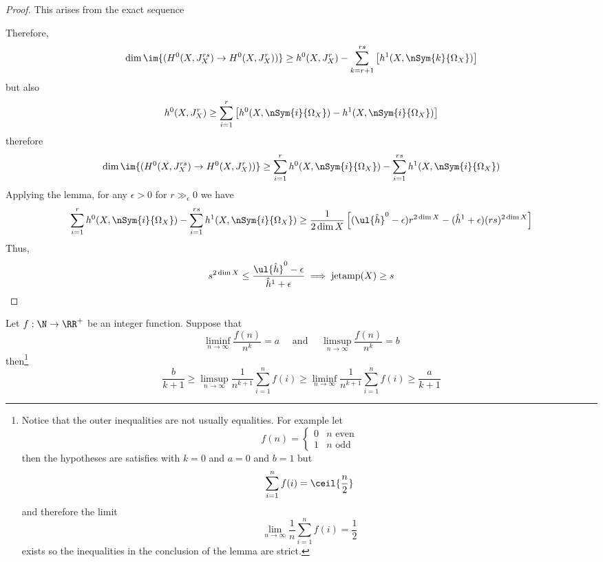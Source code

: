 \documentclass[12pt]{article}
\begin{document}
\begin{proof}
This arises from the exact sequence
\begin{center}
\end{center}
Therefore, 
\[ \dim \im{(H^0(X, J^{rs}_X) \to H^0(X, J^r_X))} \ge h^0(X, J^r_X) - \sum_{k = r+1}^{rs} \left[h^1(X, \nSym{k}{\Omega_X}) \right] \]
but also
\[ h^0(X, J^r_X) \ge \sum_{i = 1}^r \left[ h^0(X, \nSym{i}{\Omega_X}) - h^1(X, \nSym{i}{\Omega_X}) \right] \] 
therefore
\[ \dim \im{(H^0(X, J^{rs}_X) \to H^0(X, J^r_X))} \ge \sum_{i = 1}^r h^0(X, \nSym{i}{\Omega_X}) - \sum_{i = 1}^{rs} h^1(X, \nSym{i}{\Omega_X}) \]
Applying the lemma, for any $\epsilon > 0$ for $r \gg_{\epsilon} 0$ we have
\[ \sum_{i = 1}^r h^0(X, \nSym{i}{\Omega_X}) - \sum_{i = 1}^{rs} h^1(X, \nSym{i}{\Omega_X}) \ge \frac{1}{2 \dim{X}} \left[ (\ul{\hat{h}}^0 - \epsilon) r^{2 \dim{X}} - (\hat{h}^1 + \epsilon) (rs)^{2 \dim{X}} \right] \]
Thus,
\[ s^{2 \dim{X}} \le \frac{\ul{\hat{h}}^0 - \epsilon}{\hat{h}^1 + \epsilon} \implies \jetamp(X) \ge s  \]
\end{proof}

\begin{lemma}
Let $f : \N \to \RR^+$ be an integer function. Suppose that
\[ \liminf_{n \to \infty} \frac{f(n)}{n^k} = a \quad \text{ and } \quad \limsup_{n \to \infty} \frac{f(n)}{n^k} = b \]
then\footnote{Notice that the outer inequalities are not usually equalities. For example let 
\[ f(n) = \begin{cases} 0 & n \text{ even} \\ 1 & n \text{ odd} \end{cases} \]
then the hypotheses are satisfies with $k = 0$ and $a = 0$ and $b = 1$ but
\[ \sum_{i = 1}^n f(i) = \ceil{\frac{n}{2}} \] 
and therefore the limit
\[ \lim_{n \to \infty} \frac{1}{n} \sum_{i = 1}^n f(i) = \frac{1}{2} \]
exists so the inequalities in the conclusion of the lemma are strict. }
\[ \frac{b}{k+1} \ge \limsup_{n \to \infty} \frac{1}{n^{k+1}} \sum_{i = 1}^n f(i) \ge \liminf_{n \to \infty} \frac{1}{n^{k+1}} \sum_{i = 1}^n f(i) \ge \frac{a}{k+1}  \]
\end{lemma}
\end{document}

